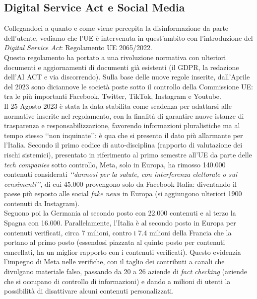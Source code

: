 \documentclass{article}
\begin{document}
\centering\newpage\subsection{Digital Service Act e Social Media}
\begin{justify}
    Collegandoci a quanto e come viene percepita la disinformazione da parte dell'utente, vediamo che l'UE è intervenuta in quest'ambito con l'introduzione del \textit{Digital Service Act}: Regolamento UE 2065/2022.\\
    Questo regolamento ha portato a una rivoluzione normativa con ulteriori documenti e aggiornamenti di documenti già esistenti (il GDPR, la redazione dell'AI ACT e via discorrendo).
    Sulla base delle nuove regole inserite, dall'Aprile del 2023 sono diciannove le società poste sotto il controllo della Commissione UE: tra le più importanti Facebook, Twitter, TikTok, Instagram e Youtube.\citep{dariano_disinformazione_2023}\\
    Il 25 Agosto 2023 è stata la data stabilita come scadenza per adattarsi alle normative inserite nel regolamento, con la finalità di garantire nuove istanze di trasparenza e responsabilizzazione, favorendo informazioni pluralistiche ma al tempo stesso ‘‘non inquinate’’: è qua che si presenta il dato più allarmante per l'Italia. Secondo il primo codice di auto-disciplina (rapporto di valutazione dei rischi sistemici), presentato in riferimento al primo semestre all'UE da parte delle \textit{tech companies} sotto controllo, Meta, solo in Europa, ha rimosso 140.000 contenuti considerati \textit{‘‘dannosi per la salute, con interferenza elettorale o sui censimenti’’}, di cui 45.000 provengono solo da Facebook Italia: diventando il paese più esposto alle social \textit{fake news} in Europa (si aggiungono ulteriori 1900 contenuti da Instagram).\\
    Seguono poi la Germania al secondo posto con 22.000 contenuti e al terzo la Spagna con 16.000.
    Parallelamente, l'Italia è al secondo posto in Europa per contenuti verificati, circa 7 milioni, contro i 7.4 milioni della Francia che la portano al primo posto (essendosi piazzata al quinto posto per contenuti cancellati, ha un miglior rapporto con i contenuti verificati).
    Questo evidenzia l'impegno di Meta nelle verifiche, con il taglio dei contributi a canali che divulgano materiale falso, passando da 20 a 26 aziende di \textit{fact checking} (aziende che si occupano di controllo di informazioni) e dando a milioni di utenti la possibilità di disattivare alcuni contenuti personalizzati.\citep{tg24_fake_2023}\\

\end{justify}
\end{document}
